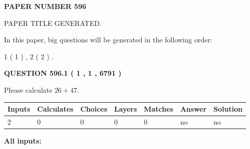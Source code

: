 \documentclass[12pt]{article}
\begin{document}
   
   
   
\newpage 
\setcounter{page}{ 
   596001 } 
   
   
   
   
 {\textbf{ \Large{ PAPER NUMBER  596  }}}
   
   
\vspace{0.2in}
   
   
   
   
   
   
   
   
 \vspace{0.2in}
 
 
 
 
   
   
 PAPER TITLE GENERATED.
   
   
   
\vspace{0.2in}
   
In this paper, big questions will be generated in the following order: 
   
   
   1 ( 1 )
 ,
   2 ( 2 )
 .
  
\vspace{0.2in}
  
{\textbf{\Large{QUESTION
596.1 
 ( 1 , 1 , 6791 )
}}}
  
  
 
Please calculate $ %
26 +  %
47 $.
 
 
   
   
   
   
\noindent\begin{tabular}{|l|l|l|l|l|l|l|}
 \hline
Inputs & Calculates & Choices & Layers & Matches & Answer & Solution \\ \hline
 2  & 
 0  & 
 0
  & 
 0  & 
 0  & 
  no & 
  no 
  \\ \hline
 \end{tabular}
   
   
   
   
\noindent{}
   
   
   
   
\noindent\vspace{0.1in}\hspace{-0.08in} {\textbf{\Large{All inputs: }}}
   
   
  
\end{document}
